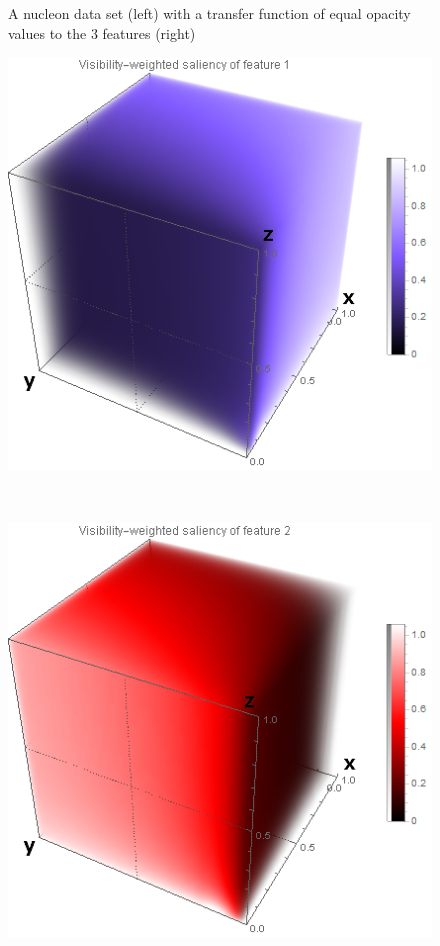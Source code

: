 \begin{figure}
\begin{minipage}{.3\textwidth}
	\end{minipage}
	\caption{A nucleon data set \cite{website:Voreen_datasets_2013} (left) with a transfer function of equal opacity values to the 3 features (right)}
	\label{fig:nucleon_naive}
\end{figure}

\begin{figure}
	\centering
	\begin{minipage}{.3\textwidth}
		\includegraphics[width=1\linewidth]{images/densityplot1}	
	\end{minipage}~
	\begin{minipage}{.3\textwidth}
		\includegraphics[width=1\linewidth]{images/densityplot2}	

\end{minipage}
\end{figure}
